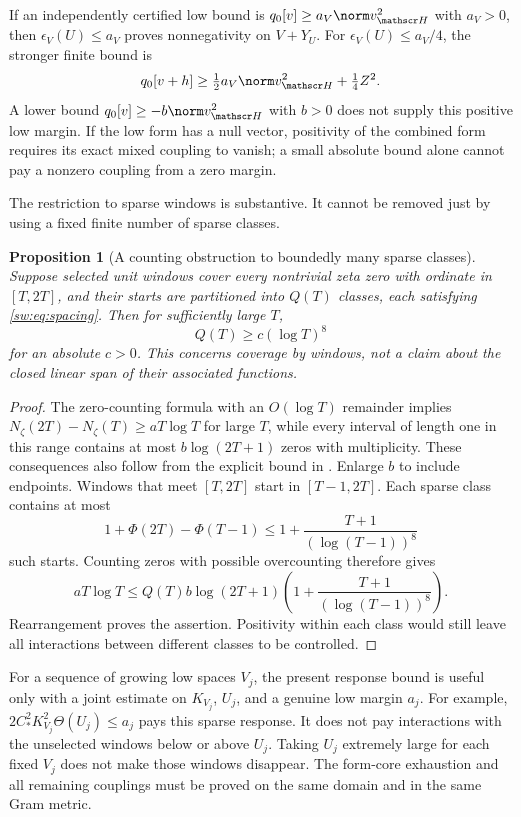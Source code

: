 \documentclass[11pt,a4paper]{article}
\numberwithin{equation}{section}
\newtheorem{proposition}[theorem]{Proposition}
\theoremstyle{definition}\newtheorem{definition}[theorem]{Definition}
\theoremstyle{remark}\newtheorem{remark}[theorem]{Remark}
\begin{document}
If an independently certified low bound is
$q_0[v]\ge a_V\norm v_{\mathscr H}^2$ with $a_V>0$, then
$\epsilon_V(U)\le a_V$ proves nonnegativity on $V+Y_U$.
For $\epsilon_V(U)\le a_V/4$, the stronger finite bound is
\[
 q_0[v+h]\ge\tfrac12a_V\norm v_{\mathscr H}^2+\tfrac14Z^2.
\]
A lower bound $q_0[v]\ge-b\norm v_{\mathscr H}^2$ with $b>0$ does not supply
this positive low margin. If the low form has a null vector, positivity of
the combined form requires its exact mixed coupling to vanish; a small
absolute bound alone cannot pay a nonzero coupling from a zero margin.

The restriction to sparse windows is substantive. It cannot be removed
just by using a fixed finite number of sparse classes.

\begin{proposition}[A counting obstruction to boundedly many sparse classes]\label{ls:prop:counting}
Suppose selected unit windows cover every nontrivial zeta zero with
ordinate in $[T,2T]$, and their starts are partitioned into $Q(T)$ classes,
each satisfying \eqref{sw:eq:spacing}. Then for sufficiently large $T$,
\[
 Q(T)\ge c(\log T)^8
\]
for an absolute $c>0$. This concerns coverage by windows, not a claim about
the closed linear span of their associated functions.
\end{proposition}
\begin{proof}
The zero-counting formula with an $O(\log T)$ remainder implies
$N_\zeta(2T)-N_\zeta(T)\ge aT\log T$ for large $T$, while every interval
of length one in this range contains at most $b\log(2T+1)$ zeros with
multiplicity. These consequences also follow from the explicit bound in
\cite[Corollary 1.2]{HSW}. Enlarge $b$ to include endpoints.
Windows that meet $[T,2T]$ start in $[T-1,2T]$. Each sparse class contains
at most
\[
 1+\Phi(2T)-\Phi(T-1)
 \le1+\frac{T+1}{(\log(T-1))^8}
\]
such starts. Counting zeros with possible overcounting therefore gives
\[
 aT\log T\le Q(T)b\log(2T+1)
 \left(1+\frac{T+1}{(\log(T-1))^8}\right).
\]
Rearrangement proves the assertion. Positivity within each class would
still leave all interactions between different classes to be controlled.
\end{proof}

For a sequence of growing low spaces $V_j$, the present response bound is
useful only with a joint estimate on $K_{V_j}$, $U_j$, and a genuine low
margin $a_j$. For example,
$2C_*^2K_{V_j}^2\Theta(U_j)\le a_j$ pays this sparse response.
It does not pay interactions with the unselected windows below or above
$U_j$. Taking $U_j$ extremely large for each fixed $V_j$ does not make
those windows disappear. The form-core exhaustion and all remaining
couplings must be proved on the same domain and in the same Gram metric.
\end{document}

